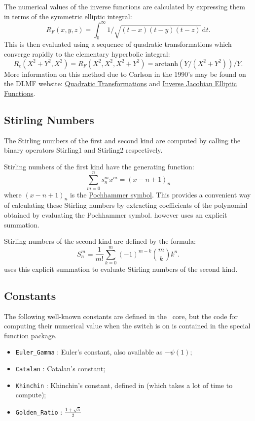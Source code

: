 The numerical values of the inverse functions are calculated by
expressing them in terms of the symmetric elliptic integral:
\[ R_F(x,y,z)=\int_0^\infty 1/\sqrt{(t-x)(t-y)(t-z)}\,\mathrm{d}t. \]
This is then evaluated using a sequence of quadratic transformations 
which converge rapidly to the elementary hyperbolic integral:
\[R_c(X^2+Y^2,X^2) = R_F(X^2,X^2,X^2+Y^2) = \mathrm{arctanh}
(Y/(X^2+Y^2))/Y.\]
More information on this method due to Carlson in the 1990's
may be found on the DLMF website:
\href{https://dlmf.nist.gov/19.36#ii}{Quadratic Transformations}
and \href{https://dlmf.nist.gov/19.25#v}{Inverse Jacobian
Elliptic Functions}.

\subsection{Stirling Numbers}
\hypertarget{STIRL}{}
The Stirling numbers of the first and second kind are computed
by calling the binary operators \f{Stirling1} and \f{Stirling2}
respectively.

Stirling numbers of the first kind have the generating function:
\[\sum_{m=0}^n s_n^m x^m  =  (x-n+1)_n\]
where $(x-n+1)_n$ is the \hyperlink{POCH}{Pochhammer symbol}. This provides
a convenient way of calculating these Stirling numbers by
extracting coefficients of the polynomial obtained by evaluating the
Pochhammer symbol.  \REDUCE however uses an explicit summation.

Stirling numbers of the second kind are defined by the formula:
\[S_n^m = \frac{1}{m!} \sum_{k=0}^m (-1)^{m-k} \binom{m}{k} k^n.\]
\REDUCE uses this explicit summation to evaluate Stirling numbers of the
second kind.

\subsection{Constants}
\hypertarget{CONSTS}{}

The following well-known constants are defined in the \REDUCE\ core,
but the code for computing their numerical value when the switch 
is on is contained in the special function package.
\begin{itemize}
\item \texttt{Euler\_Gamma} : Euler's constant, also available as $-\psi(1)$;
\item \texttt{Catalan} : Catalan's constant;
\item \texttt{Khinchin} : Khinchin's constant, defined in \cite{Khinchin:64}
(which takes a lot of time to compute);
\item \texttt{Golden\_Ratio} : $\displaystyle\frac{1 + \sqrt{5}}{2}$
\end{itemize}


